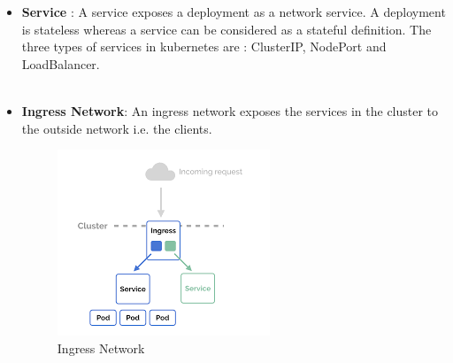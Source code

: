 \documentclass[11pt]{report}
\begin{document}
\begin{enumerate}
\begin{itemize}
\begin{figure}[h!]
		\end{figure}
			\\
			\\
			\\
			\item
			\textbf{Service} : A service exposes a deployment as a network service. A deployment is stateless whereas a service can be considered as a stateful definition. The three types of services in kubernetes are : ClusterIP, NodePort and LoadBalancer. 
			\\
			\\
			\item
			\textbf{Ingress Network}: An ingress network exposes the services in the cluster to the outside network i.e. the clients.
			\\
			\begin{figure}[h!]
    	\begin{center}
    	    \includegraphics[scale=0.6]{ingress.png}
    		\caption{Ingress Network \cite{Ingress}}
    	  \end{center}
	  
		\end{figure}
			
		\end{itemize}
	\end{enumerate}
	\pagebreak
\end{document}
